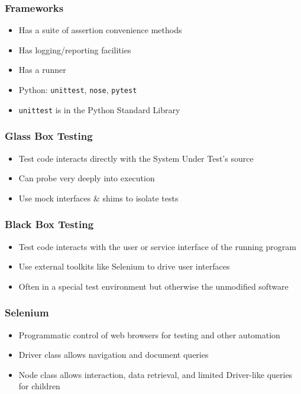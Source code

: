 \begin{frame}
  \frametitle{Frameworks}
  \begin{itemize}
    \item Has a suite of assertion convenience methods
    \item Has logging/reporting facilities
    \item Has a runner
    \item Python: \texttt{unittest}, \texttt{nose}, \texttt{pytest}
    \item \texttt{unittest} is in the Python Standard Library
  \end{itemize}
\end{frame}

\begin{frame}
  \frametitle{Glass Box Testing}
  \begin{itemize}
    \item Test code interacts directly with the System Under Test's source
    \item Can probe very deeply into execution
    \item Use mock interfaces \& shims to isolate tests
  \end{itemize}
\end{frame}

\begin{frame}
  \frametitle{Black Box Testing}
  \begin{itemize}
    \item Test code interacts with the user or service interface of the running program
    \item Use external toolkits like Selenium to drive user interfaces
    \item Often in a special test environment but otherwise the unmodified software
  \end{itemize}
\end{frame}

\begin{frame}
  \frametitle{Selenium}
  \begin{itemize}
    \item Programmatic control of web browsers for testing and other automation
    \item Driver class allows navigation and document queries
    \item Node class allows interaction, data retrieval, and limited Driver-like queries for children
  \end{itemize}
\end{frame}

